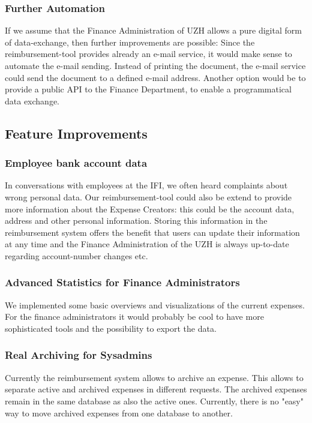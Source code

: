 \subsubsection{Further Automation}
If we assume that the Finance Administration of UZH allows a pure digital form of data-exchange, then further improvements are possible: Since the reimbursement-tool provides already an e-mail service, it would make sense to automate the e-mail sending. Instead of printing the document, the e-mail service could send the document to a defined e-mail address. Another option would be to provide a public API to the Finance Department, to enable a programmatical data exchange.\par 

\subsection{Feature Improvements}
\subsubsection{Employee bank account data}
In conversations with employees at the IFI, we often heard complaints about wrong personal data. Our reimbursement-tool could also be extend to provide more information about the Expense Creators: this could be the account data, address and other personal information. Storing this information in the reimbursement system offers the benefit that users can update their information at any time and the Finance Administration of the UZH is always up-to-date regarding account-number changes etc.

\subsubsection{Advanced Statistics for Finance Administrators } 
We implemented some basic overviews and visualizations of the current expenses. For the finance administrators it would probably be cool to have more sophisticated tools and the possibility to export the data.

\subsubsection{Real Archiving for Sysadmins} 
Currently the reimbursement system allows to archive an expense. This allows to separate active and archived expenses in different requests. The archived expenses remain in the same database as also the active ones. Currently, there is no "easy" way to move archived expenses from one database to another.

